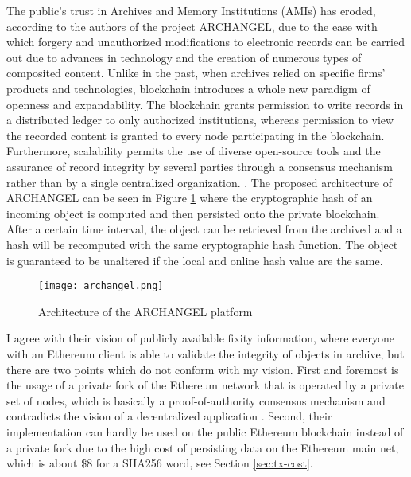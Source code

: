 The public's trust in Archives and Memory Institutions (AMIs) has eroded, according to the authors of the project ARCHANGEL, due to the ease with which forgery and unauthorized modifications to electronic records can be carried out due to advances in technology and the creation of numerous types of composited content. Unlike in the past, when archives relied on specific firms' products and technologies, blockchain introduces a whole new paradigm of openness and expandability. The blockchain grants permission to write records in a distributed ledger to only authorized institutions, whereas permission to view the recorded content is granted to every node participating in the blockchain. Furthermore, scalability permits the use of diverse open-source tools and the assurance of record integrity by several parties through a consensus mechanism rather than by a single centralized organization. \cite[4]{wang2021research}.
The proposed architecture of ARCHANGEL can be seen in Figure \ref{fig:archangel} where the cryptographic hash of an incoming object is computed and then persisted onto the private blockchain. After a certain time interval, the object can be retrieved from the archived and a hash will be recomputed with the same cryptographic hash function. The object is guaranteed to be unaltered if the local and online hash value are the same.
\begin{figure}[t]
    \centering
    \texttt{[image: archangel.png]}
    \caption{Architecture of the ARCHANGEL platform \cite[2]{collomosse2018archangel}}
    \label{fig:archangel}
\end{figure}
I agree with their vision of publicly available fixity information, where everyone with an Ethereum client is able to validate the integrity of objects in archive, but there are two points which do not conform with my vision. First and foremost is the usage of a private fork of the Ethereum network that is operated by a private set of nodes, which is basically a proof-of-authority consensus mechanism and contradicts the vision of a decentralized application \cite[3]{collomosse2018archangel}. Second, their implementation can hardly be used on the public Ethereum blockchain instead of a private fork due to the high cost of persisting data on the Ethereum main net, which is about \$8 for a SHA256 word, see Section \ref{sec:tx-cost}. 


